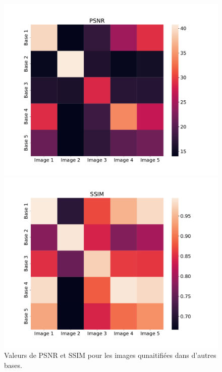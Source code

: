 \documentclass{article}[letterpaper, 11pt]
\begin{document}
\begin{figure}[h]
    \begin{minipage}[c]{.49\linewidth}
        \centering
        \includegraphics[scale = 0.25]{psnr.pdf}
    \end{minipage}
    \begin{minipage}[c]{.49\linewidth}
        \centering
        \includegraphics[scale = 0.25]{ssim.pdf}
    \end{minipage}
    \caption{Valeurs de PSNR et SSIM pour les images qunaitifiées dans d'autres bases.}
\end{figure}
\end{document}
